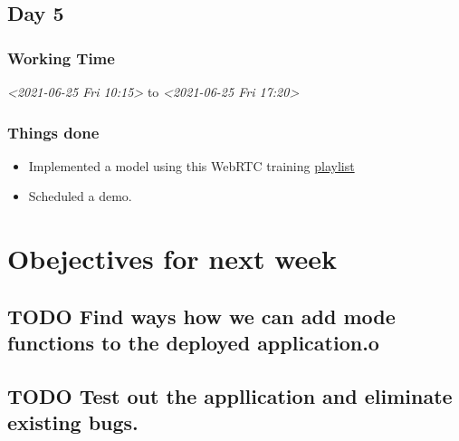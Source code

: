 \documentclass[11pt]{article}
\begin{document}
\subsection*{Day 5}
\label{sec:orgd98b282}
\subsubsection*{Working Time}
\label{sec:org34ef37f}
\textit{<2021-06-25 Fri 10:15> } to \textit{<2021-06-25 Fri 17:20>}

\subsubsection*{Things done}
\label{sec:org88e19a7}
\begin{itemize}
\item Implemented a model using this WebRTC training \href{https://www.youtube.com/playlist?list=PLayYqdnyegt0qX8EfEGExxZF3DxkyA1Dj}{playlist}
\item Scheduled a demo.
\end{itemize}

\section*{Obejectives for next week}
\label{sec:orgf496b9d}

\subsection*{{\bfseries\sffamily TODO} Find ways how we can add mode functions to the deployed application.o}
\label{sec:org62f3179}
\subsection*{{\bfseries\sffamily TODO} Test out the appllication and eliminate existing bugs.}
\label{sec:orga18a133}
\end{document}
